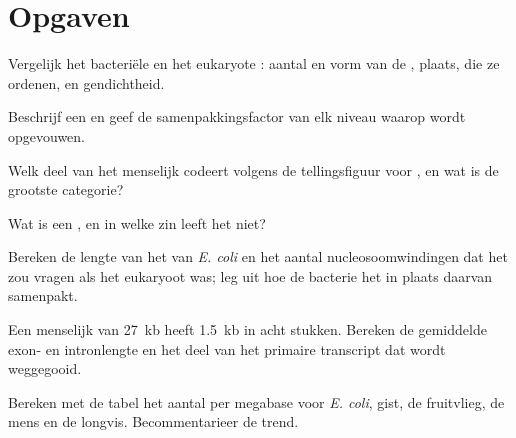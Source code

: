 \section{Opgaven}

\begin{exercise}[$\star$]\label{exo:b1:genomes:1}
Vergelijk het bacteriële en het eukaryote : aantal en vorm van de
, plaats,  die ze ordenen, en gendichtheid.
\end{exercise}

\begin{exercise}[$\star$]\label{exo:b1:genomes:2}
Beschrijf een  en geef de samenpakkingsfactor van elk niveau waarop
 wordt opgevouwen.
\end{exercise}

\begin{exercise}[$\star$]\label{exo:b1:genomes:3}
Welk deel van het menselijk  codeert volgens de tellingsfiguur voor , en
wat is de grootste categorie?
\end{exercise}

\begin{exercise}[$\star$]\label{exo:b1:genomes:4}
Wat is een , en in welke zin leeft het niet?
\end{exercise}

\begin{exercise}[$\star\star$]\label{exo:b1:genomes:5}
Bereken de lengte van het  van \emph{E. coli} en het aantal
nucleosoomwindingen dat het zou vragen als het eukaryoot was; leg uit hoe de
bacterie het in plaats daarvan samenpakt.
\end{exercise}

\begin{exercise}[$\star\star$]\label{exo:b1:genomes:6}
Een menselijk  van \qty{27}{kb} heeft \qty{1.5}{kb}  in acht stukken.
Bereken de gemiddelde exon- en intronlengte en het deel van het primaire transcript
dat wordt weggegooid.
\end{exercise}

\begin{exercise}[$\star\star$]\label{exo:b1:genomes:7}
Bereken met de tabel het aantal  per megabase voor \emph{E. coli}, gist, de
fruitvlieg, de mens en de longvis. Becommentarieer de trend.
\end{exercise}

